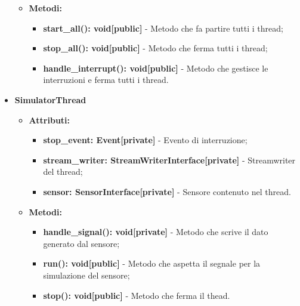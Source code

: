 \documentclass[8pt]{article}
\begin{document}
\begin{itemize}
\begin{itemize}
\begin{itemize}
        \end{itemize}
        \item \textbf{Metodi:}
        \begin{itemize}
            \item \textbf{start\_all(): void[public]} - Metodo che fa partire tutti i thread;
            \item \textbf{stop\_all(): void[public]} - Metodo che ferma tutti i thread;
            \item \textbf{handle\_interrupt(): void[public]} - Metodo che gestisce le interruzioni e ferma tutti i thread.
        \end{itemize}
    \end{itemize}
    \item \textbf{SimulatorThread}
    \begin{itemize}
        \item \textbf{Attributi:}
        \begin{itemize}
            \item \textbf{stop\_event: Event[private]} - Evento di interruzione;
            \item \textbf{stream\_writer: StreamWriterInterface[private]} - Streamwriter del thread;
            \item \textbf{sensor: SensorInterface[private]} - Sensore contenuto nel thread.
        \end{itemize}
        \item \textbf{Metodi:}
        \begin{itemize}
            \item \textbf{handle\_signal(): void[private]} - Metodo che scrive il dato generato dal sensore;
            \item \textbf{run(): void[public]} - Metodo che aspetta il segnale per la simulazione del sensore;
            \item \textbf{stop(): void[public]} - Metodo che ferma il thead.
        \end{itemize}
    \end{itemize}
\end{itemize}
\end{document}
